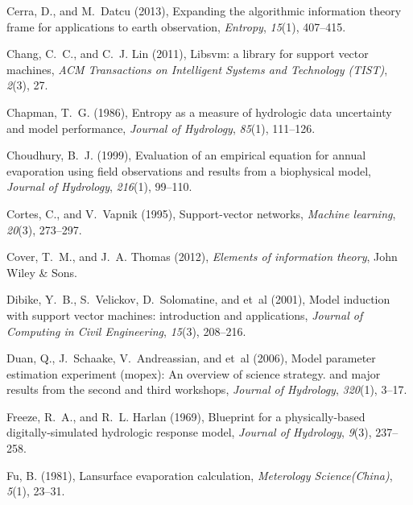 \documentclass[draft,wrr]{AGUTeX}
\begin{document}
\begin{article}
\begin{thebibliography}{59}
Cerra, D., and M.~Datcu (2013), Expanding the algorithmic information theory
  frame for applications to earth observation, \textit{Entropy},
  \textit{15}(1), 407--415.

Chang, C.~C., and C.~J. Lin (2011), Libsvm: a library for support vector
  machines, \textit{ACM Transactions on Intelligent Systems and Technology
  (TIST)}, \textit{2}(3), 27.

Chapman, T.~G. (1986), Entropy as a measure of hydrologic data uncertainty and
  model performance, \textit{Journal of Hydrology}, \textit{85}(1), 111--126.

Choudhury, B.~J. (1999), Evaluation of an empirical equation for annual
  evaporation using field observations and results from a biophysical model,
  \textit{Journal of Hydrology}, \textit{216}(1), 99--110.

Cortes, C., and V.~Vapnik (1995), Support-vector networks, \textit{Machine
  learning}, \textit{20}(3), 273--297.

Cover, T.~M., and J.~A. Thomas (2012), \textit{Elements of information theory},
  John Wiley \& Sons.

Dibike, Y.~B., S.~Velickov, D.~Solomatine, and et~al (2001), Model induction
  with support vector machines: introduction and applications, \textit{Journal
  of Computing in Civil Engineering}, \textit{15}(3), 208--216.

Duan, Q., J.~Schaake, V.~Andreassian, and et~al (2006), Model parameter
  estimation experiment (mopex): An overview of science strategy. and major
  results from the second and third workshops, \textit{Journal of Hydrology},
  \textit{320}(1), 3--17.

Freeze, R.~A., and R.~L. Harlan (1969), Blueprint for a physically-based
  digitally-simulated hydrologic response model, \textit{Journal of Hydrology},
  \textit{9}(3), 237--258.

Fu, B. (1981), Lansurface evaporation calculation, \textit{Meterology
  Science(China)}, \textit{5}(1), 23--31.


\end{thebibliography}
\end{article}
\end{document}
